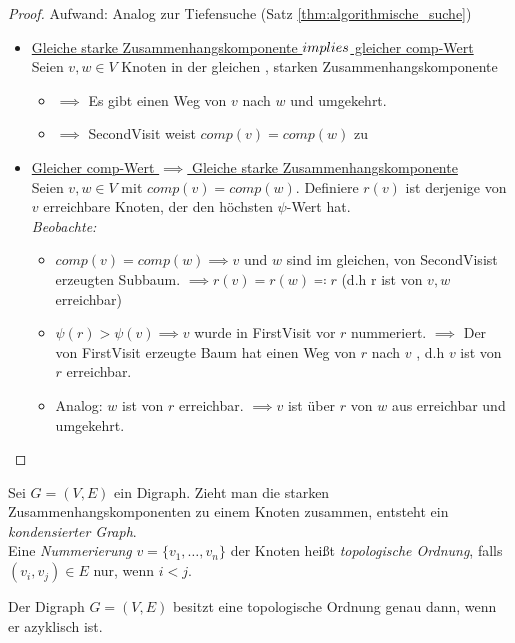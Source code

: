\begin{proof}
	 Aufwand: Analog zur Tiefensuche (Satz \ref{thm:algorithmische_suche})
\begin{itemize}
	\item \underline{Gleiche starke Zusammenhangskomponente $\\implies $ gleicher comp-Wert} \\
Seien $v,w \in V$ Knoten in der gleichen , starken Zusammenhangskomponente \\
\begin{itemize}
	\item $\implies $ Es gibt einen Weg von $v$ nach $w$ und umgekehrt.
	\item $\implies $ SecondVisit weist $comp(v)=comp(w)$ zu
\end{itemize}
\item \underline{Gleicher comp-Wert $\implies $ Gleiche starke Zusammenhangskomponente} \\
Seien $v,w \in V$ mit $comp(v)=comp(w)$. Definiere $r(v)$ ist derjenige von $v$  erreichbare Knoten, der den höchsten $\psi$-Wert hat. \\
\emph{Beobachte:}
\begin{itemize}
	\item $comp(v)=comp(w) \implies v \text{ und } w$  sind im gleichen, von SecondVisist erzeugten Subbaum.
	$\implies r(v)=r(w) \eqqcolon r$ (d.h r ist von $v,w$ erreichbar)
\item $\psi(r)>\psi(v) \implies v$ wurde in FirstVisit vor $r$ nummeriert. $\implies $ Der von FirstVisit erzeugte Baum hat einen Weg von $r$ nach $v$ , d.h $v$ ist von $r$ erreichbar.
\item Analog: $w$ ist von $r$ erreichbar. $\implies v$ ist über $r$ von $w$  aus erreichbar und umgekehrt. 
\end{itemize}
\end{itemize}
\end{proof}
\begin{definition}
	Sei $G=(V,E)$  ein Digraph. Zieht man die starken Zusammenhangskomponenten zu einem Knoten zusammen, entsteht ein \emph{kondensierter Graph}. \\
Eine \emph{Nummerierung} $v=\{v_1,\ldots,v_n\}$ der Knoten heißt \emph{topologische Ordnung}, falls $(v_i, v_j) \in  E$ nur, wenn $i<j$.
\end{definition}
\begin{lemma}
	\label{lem:topo_ordnung}
Der Digraph $G=(V,E)$  besitzt eine topologische Ordnung genau dann, wenn er azyklisch ist.
\end{lemma}
